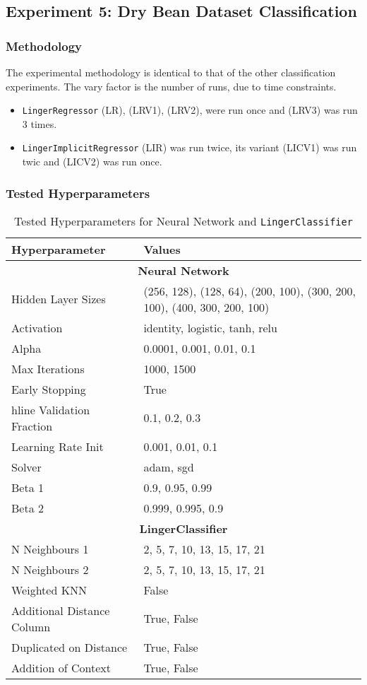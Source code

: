 \documentclass[a4paper, 12pt]{report}
\begin{document}
\subsection{Experiment 5: Dry Bean Dataset Classification}
\subsubsection{Methodology}
The experimental methodology is identical to that of the other classification experiments.
The vary factor is the number of runs, due to time constraints.
\begin{itemize}
    \item \texttt{LingerRegressor} (LR),  (LRV1), (LRV2), were run once and (LRV3) was run 3 times.
    \item \texttt{LingerImplicitRegressor} (LIR) was run twice, its variant (LICV1) was run twic and (LICV2) was run once.
\end{itemize}

\subsubsection{Tested Hyperparameters}
\begin{table}[H]
    \centering
    \caption{Tested Hyperparameters for Neural Network and \texttt{LingerClassifier}}
    \label{tab:hyperparameters_raisin}
    \small
    \begin{tabular}{|l|l|}
    \hline
    \textbf{Hyperparameter} & \textbf{Values} \\ \hline
    \multicolumn{2}{|c|}{\textbf{Neural Network}} \\ \hline
    Hidden Layer Sizes & (256, 128), (128, 64), (200, 100), (300, 200, 100), (400, 300, 200, 100) \\ \hline
    Activation & identity, logistic, tanh, relu \\ \hline
    Alpha & 0.0001, 0.001, 0.01, 0.1 \\ \hline
    Max Iterations & 1000, 1500 \\ \hline
    Early Stopping & True \\hline
    Validation Fraction & 0.1, 0.2, 0.3 \\ \hline
    Learning Rate Init & 0.001, 0.01, 0.1 \\ \hline
    Solver & adam, sgd \\ \hline
    Beta 1 & 0.9, 0.95, 0.99 \\ \hline
    Beta 2 & 0.999, 0.995, 0.9 \\ \hline
    \multicolumn{2}{|c|}{\textbf{LingerClassifier}} \\ \hline
    N Neighbours 1 & 2, 5, 7, 10, 13, 15, 17, 21 \\ \hline
    N Neighbours 2 & 2, 5, 7, 10, 13, 15, 17, 21 \\ \hline
    Weighted KNN & False \\ \hline
    Additional Distance Column & True, False \\ \hline
    Duplicated on Distance & True, False \\ \hline
    Addition of Context & True, False \\ \hline
    \end{tabular}
\end{table}
\clearpage
\end{document}
